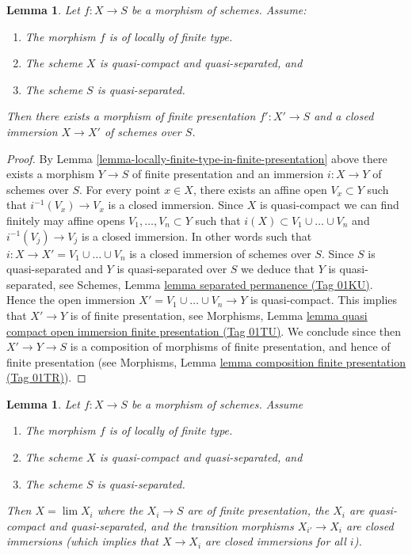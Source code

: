 \documentclass{amsart}
\theoremstyle{plain}
\newtheorem{lemma}[subsection]{Lemma}
\theoremstyle{definition}
\theoremstyle{remark}
\numberwithin{equation}{subsection}
\def\lim{\mathop{\mathrm{lim}}\nolimits}
\begin{document}
\begin{lemma}
\label{lemma-finite-type-closed-in-finite-presentation}
Let $f : X \to S$ be a morphism of schemes.
Assume:
\begin{enumerate}
\item The morphism $f$ is of locally of finite type.
\item The scheme $X$ is quasi-compact and quasi-separated, and
\item The scheme $S$ is quasi-separated.
\end{enumerate}
Then there exists a morphism of finite presentation
$f' : X' \to S$ and a closed immersion $X \to X'$ of schemes over $S$.
\end{lemma}

\begin{proof}
By Lemma \ref{lemma-locally-finite-type-in-finite-presentation} above
there exists a morphism $Y \to S$ of finite presentation and an
immersion $i : X \to Y$ of schemes over $S$.
For every point $x \in X$, there exists an affine open
$V_x \subset Y$ such that $i^{-1}(V_x) \to V_x$ is a
closed immersion. Since $X$ is quasi-compact we can find
finitely may affine opens $V_1, \ldots, V_n \subset Y$
such that $i(X) \subset V_1 \cup \ldots \cup V_n$ and
$i^{-1}(V_j) \to V_j$ is a closed immersion. In other words
such that $i : X \to X' = V_1 \cup \ldots \cup V_n$ is a
closed immersion of schemes over $S$.
Since $S$ is quasi-separated and $Y$ is quasi-separated over $S$
we deduce that $Y$ is quasi-separated, see
Schemes, Lemma \href{https://stacks.math.columbia.edu/tag/01KU}{lemma separated permanence (Tag 01KU)}.
Hence the open immersion $X' = V_1 \cup \ldots \cup V_n \to Y$
is quasi-compact. This implies that
$X' \to Y$ is of finite presentation, see
Morphisms,
Lemma \href{https://stacks.math.columbia.edu/tag/01TU}{lemma quasi compact open immersion finite presentation (Tag 01TU)}.
We conclude since then $X' \to Y \to S$ is a composition of morphisms
of finite presentation, and hence of finite presentation (see
Morphisms, Lemma \href{https://stacks.math.columbia.edu/tag/01TR}{lemma composition finite presentation (Tag 01TR)}).
\end{proof}


\begin{lemma}
\label{lemma-finite-type-is-limit-finite-presentation}
Let $f : X \to S$ be a morphism of schemes. Assume
\begin{enumerate}
\item The morphism $f$ is of locally of finite type.
\item The scheme $X$ is quasi-compact and quasi-separated, and
\item The scheme $S$ is quasi-separated.
\end{enumerate}
Then $X = \lim X_i$ where the $X_i \to S$ are of
finite presentation, the $X_i$ are quasi-compact and quasi-separated,
and the transition morphisms $X_{i'} \to X_i$ are closed immersions
(which implies that $X \to X_i$ are closed immersions for all $i$).
\end{lemma}
\end{document}
